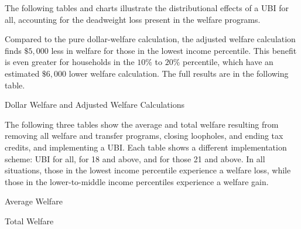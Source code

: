 \documentclass{article}
\begin{document}
The following tables and charts illustrate the distributional effects of a UBI for all, accounting for the deadweight loss present in the welfare programs.

Compared to the pure dollar-welfare calculation, the adjusted welfare calculation finds $\$5,000$ less in welfare for those in the lowest income percentile. This benefit is even greater for households in the $10\%$ to $20\%$ percentile, which have an estimated $\$6,000$ lower welfare calculation. The full results are in the following table. 

\begin{table}[H]
\caption{Dollar Welfare and Adjusted Welfare Calculations}
\begin{center}
\begin{adjustbox}{max width=\textwidth}

\end{adjustbox}
\end{center}
\end{table}

The following three tables show the average and total welfare resulting from removing all welfare and transfer programs, closing loopholes, and ending tax credits, and implementing a UBI. Each table shows a different implementation scheme: UBI for all, for 18 and above, and for those 21 and above. In all situations, those in the lowest income percentile experience a welfare loss, while those in the lower-to-middle income percentiles experience a welfare gain. 


\begin{table}[H]
\caption{Average Welfare}
\begin{center}
\begin{adjustbox}{max width=\textwidth}

\end{adjustbox}
\end{center}
\end{table}


\begin{table}[H]
\caption{Total Welfare}
\begin{center}
\begin{adjustbox}{max width=\textwidth}

\end{adjustbox}
\end{center}
\end{table}
\end{document}
